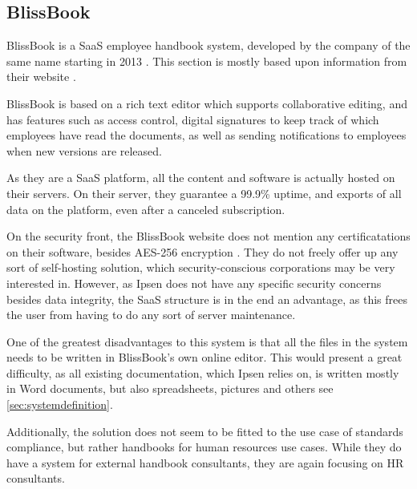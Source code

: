 \subsection{BlissBook}
BlissBook is a SaaS employee handbook system, developed by the company of the same name starting in 2013 \cite{BlissbookInfo}.
This section is mostly based upon information from their website \cite{BlissbookContents}.

BlissBook is based on a rich text editor which supports collaborative editing, and has features such as access control, digital signatures to keep track of which employees have read the documents, as well as sending notifications to employees when new versions are released.

As they are a SaaS platform, all the content and software is actually hosted on their servers.
On their server, they guarantee a 99.9\% uptime, and exports of all data on the platform, even after a canceled subscription.

On the security front, the BlissBook website does not mention any certificatations on their software, besides  AES-256 encryption \cite{BlissbookSecurity}.
They do not freely offer up any sort of self-hosting solution, which security-conscious corporations may be very interested in.
However, as Ipsen does not have any specific security concerns besides data integrity, the SaaS structure is in the end an advantage, as this frees the user from having to do any sort of server maintenance.

One of the greatest disadvantages to this system is that all the files in the system needs to be written in BlissBook's own online editor.
This would present a great difficulty, as all existing documentation, which Ipsen relies on, is written mostly in Word documents, but also spreadsheets, pictures and others see \cref{sec:systemdefinition}.

Additionally, the solution does not seem to be fitted to the use case of standards compliance, but rather handbooks for human resources use cases.
While they do have a system for external handbook consultants, they are again focusing on HR consultants. \cite{BlissbookHandbook}
